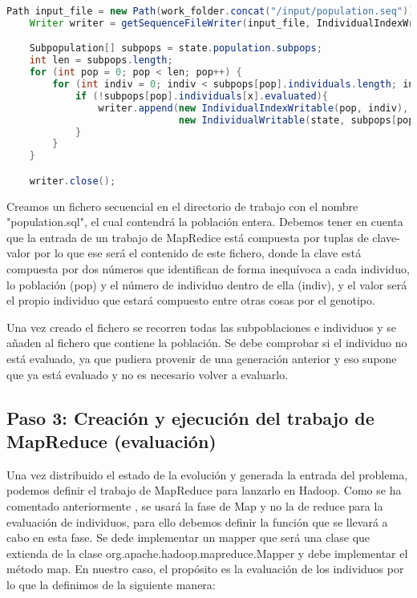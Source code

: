 \begin{lstlisting}[language=Java]
	Path input_file = new Path(work_folder.concat("/input/population.seq"));
	Writer writer = getSequenceFileWriter(input_file, IndividualIndexWritable.class, IndividualWritable.class);

	Subpopulation[] subpops = state.population.subpops;
	int len = subpops.length;
	for (int pop = 0; pop < len; pop++) {
		for (int indiv = 0; indiv < subpops[pop].individuals.length; indiv++) {
			if (!subpops[pop].individuals[x].evaluated){
				writer.append(new IndividualIndexWritable(pop, indiv), 
						      new IndividualWritable(state, subpops[pop].individuals[indiv]));
			}
		}
	}

	writer.close();
\end{lstlisting}

Creamos un fichero secuencial en el directorio de trabajo con el nombre "population.sql", el cual contendrá la población entera. Debemos tener en cuenta que la entrada de un trabajo de MapRedice est\'a compuesta por tuplas de clave-valor por lo que ese ser\'a el contenido de este fichero, donde la clave est\'a compuesta por dos números que identifican de forma inequívoca a cada individuo, lo población (pop) y el n\'umero de individuo dentro de ella (indiv), y el valor ser\'a el propio individuo que estará compuesto entre otras cosas por el genotipo.

Una vez creado el fichero se recorren todas las subpoblaciones e individuos y se a\~naden al fichero que contiene la población. Se debe comprobar si el individuo no est\'a evaluado, ya que pudiera provenir de una generación anterior y eso supone que ya est\'a evaluado y no es necesario volver a evaluarlo.

\subsection{Paso 3: Creación y ejecución del trabajo de MapReduce (evaluación)}

Una vez distribuido el estado de la evolución y generada la entrada del problema, podemos definir el trabajo de MapReduce para lanzarlo en Hadoop. Como se ha comentado anteriormente , se usar\'a la fase de Map y no la de reduce para la evaluación de individuos, para ello debemos definir la función que se llevar\'a a cabo en esta fase. Se dede implementar un mapper que ser\'a una clase que extienda de la clase org.apache.hadoop.mapreduce.Mapper y debe implementar el método map. En nuestro caso, el propósito es la evaluación de los individuos por lo que la definimos de la siguiente manera:

